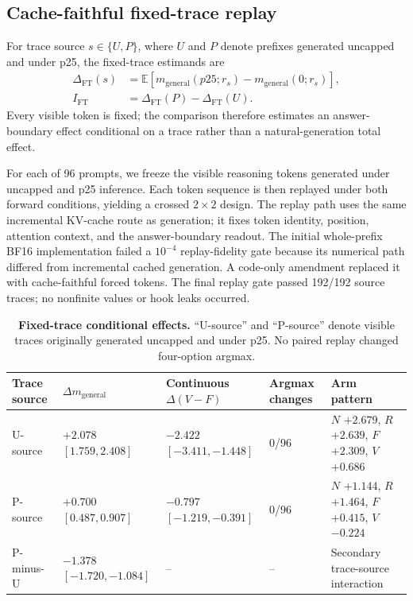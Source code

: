 \documentclass[letterpaper]{article}
\begin{document}
\subsection{Cache-faithful fixed-trace replay}

For trace source $s\in\{U,P\}$, where $U$ and $P$ denote prefixes generated uncapped and under p25, the fixed-trace estimands are
\begin{align}
\Delta_{\mathrm{FT}}(s)
&=\mathbb{E}\!\left[m_{\mathrm{general}}(p25;r_s)-m_{\mathrm{general}}(0;r_s)\right],\\
I_{\mathrm{FT}}&=\Delta_{\mathrm{FT}}(P)-\Delta_{\mathrm{FT}}(U).
\end{align}
Every visible token is fixed; the comparison therefore estimates an answer-boundary effect conditional on a trace rather than a natural-generation total effect.

For each of 96 prompts, we freeze the visible reasoning tokens generated under uncapped and p25 inference.  Each token sequence is then replayed under both forward conditions, yielding a crossed $2\times2$ design.  The replay path uses the same incremental KV-cache route as generation; it fixes token identity, position, attention context, and the answer-boundary readout.  The initial whole-prefix BF16 implementation failed a $10^{-4}$ replay-fidelity gate because its numerical path differed from incremental cached generation.  A code-only amendment replaced it with cache-faithful forced tokens.  The final replay gate passed 192/192 source traces; no nonfinite values or hook leaks occurred.

\begin{table}[t]
\centering
\small
\begin{tabular}{lL{3.0cm}L{3.0cm}L{3.0cm}L{3.5cm}}
\toprule
Trace source & $\Delta m_{\mathrm{general}}$ & Continuous $\Delta(V-F)$ & Argmax changes & Arm pattern \\
\midrule
U-source & $+2.078$ $[1.759,2.408]$ & $-2.422$ $[-3.411,-1.448]$ & 0/96 & $N$ $+2.679$, $R$ $+2.639$, $F$ $+2.309$, $V$ $+0.686$ \\
P-source & $+0.700$ $[0.487,0.907]$ & $-0.797$ $[-1.219,-0.391]$ & 0/96 & $N$ $+1.144$, $R$ $+1.464$, $F$ $+0.415$, $V$ $-0.224$ \\
P-minus-U & $-1.378$ $[-1.720,-1.084]$ & -- & -- & Secondary trace-source interaction \\
\bottomrule
\end{tabular}
\caption{\textbf{Fixed-trace conditional effects.} ``U-source'' and ``P-source'' denote visible traces originally generated uncapped and under p25.  No paired replay changed four-option argmax.}
\label{tab:supp-fixed}
\end{table}
\end{document}
